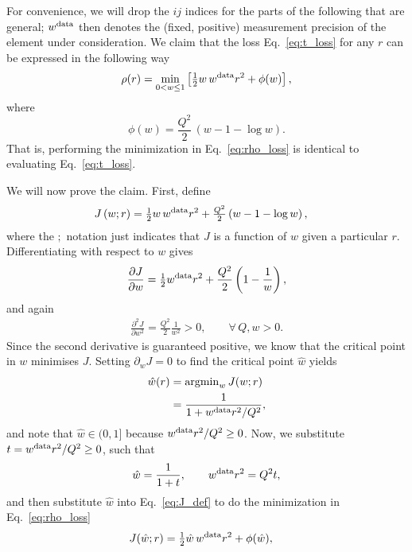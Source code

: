 \documentclass[onecolumn,floatfix,linenumbers,trackchanges]{aastex631}
\begin{document}
For convenience, we will drop the $ij$ indices for the parts of the following that are general; $w^{\rm data}$ then denotes the (fixed, positive) measurement precision of the element under consideration.
We claim that the loss Eq.~\eqref{eq:t_loss} for any $r$ can be expressed in the following way
\begin{equation}
    \rho(r) = \min_{0<w\leq1} \left[ \tfrac{1}{2} w\, w^{\rm data} r^2 + \phi(w) \right], \label{eq:rho_loss}
\end{equation}
where
\begin{equation}
    \phi(w) = \frac{Q^2}{2}\,(w - 1 - \log w).
\end{equation}
That is, performing the minimization in Eq.~\eqref{eq:rho_loss} is identical to evaluating Eq.~\eqref{eq:t_loss}.

We will now prove the claim. First, define
\begin{align}
    J\left( w ; r \right) &= \tfrac{1}{2} w\, w^{\rm data} r^2 + \tfrac{Q^2}{2} \left( w - 1 - \log{w}\right), \label{eq:J_def}
\end{align}
where the $;$ notation just indicates that $J$ is a function of $w$ given a particular $r$.
Differentiating with respect to $w$ gives
\begin{equation}
    \frac{\partial J}{\partial w}
    = \tfrac{1}{2}w^{\rm data} r^2 + \frac{Q^2}{2}\left(1 - \frac{1}{w}\right),
\end{equation}
and again
\begin{align}
    \frac{\partial^2 J}{\partial w^2} = \frac{Q^2}{2} \frac{1}{w^2} > 0, \qquad \forall \, Q,w > 0.
\end{align}
Since the second derivative is guaranteed positive, we know that the critical point in $w$ minimises $J$.
Setting $\partial_w J=0$ to find the critical point $\hat{w}$ yields
\begin{align}
    \hat{w}(r) &= {\rm argmin}_w \, J (w ; r) \\
    &= \frac{1}{1 + w^{\rm data} r^2/Q^2}, \label{eq:w_hat}
\end{align}
and note that $\hat{w} \in (0, 1]$ because $w^{\rm data} r^2/Q^2 \geq 0$.
Now, we substitute $t = w^{\rm data} r^2/Q^2 \geq 0$, such that
\begin{equation}
    \hat{w} = \frac{1}{1+t}, \qquad w^{\rm data} r^2 = Q^2 t,
\end{equation}
and then substitute $\hat{w}$ into Eq.~\eqref{eq:J_def} to do the minimization in Eq.~\eqref{eq:rho_loss}
\begin{align}
    J (\hat{w} ; r) &= \tfrac{1}{2} \hat{w}\, w^{\rm data} r^2 + \phi(\hat{w}),
\end{align}
\end{document}
